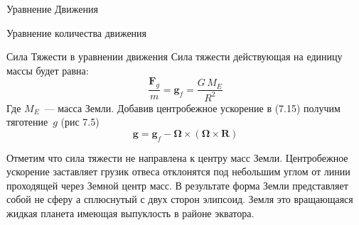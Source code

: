 \begin{chapter}{Уравнение Движения}
\begin{section}{Уравнение количества движения}
\begin{paragraph}{Сила Тяжести в уравнении движения}
Сила тяжести действующая на единицу массы будет равна:
\begin{equation}
\frac{\textbf{F}_g}{m} = \textbf{g}_f =\frac{G\,M_E}{R^2}
\end{equation}
Где $M_E$~--- масса Земли. Добавив центробежное ускорение в (7.15)
получим тяготение~$g$ (рис 7.5)
\begin{equation}
\textbf{g} = \textbf{g}_f - \boldsymbol{\Omega} \times
\left( \boldsymbol{\Omega} \times \mathbf{R}
\right)
\end{equation}
%

Отметим что сила тяжести не направлена к центру масс
Земли. Центробежное ускорение заставляет грузик отвеса отклонятся под
небольшим углом от линии проходящей через Земной центр масс. В
результате форма Земли представляет собой не сферу а сплюснутый с двух
сторон элипсоид. Земля это вращающаяся жидкая планета имеющая
выпуклость в районе экватора.
%
\end{paragraph}



\end{section}
\end{chapter}
